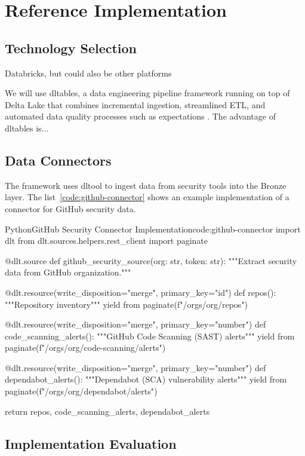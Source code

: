 \chapter{Reference Implementation}
\label{ch:implementation}

\section{Technology Selection}

Databricks, but could also be other platforms

We will use \gls{dltables}, a data engineering pipeline framework running on top of Delta Lake that combines incremental ingestion, streamlined ETL, and automated data quality processes such as expectations \cite{Lee2024}. The advantage of \gls{dltables} is...

\section{Data Connectors}

The framework uses \gls{dltool} to ingest data from security tools into the Bronze layer. The list~\ref{code:github-connector} shows an example implementation of a connector for GitHub security data.

\begin{code}{Python}{GitHub Security Connector Implementation}{code:github-connector}
import dlt
from dlt.sources.helpers.rest_client import paginate

@dlt.source
def github_security_source(org: str, token: str):
    """Extract security data from GitHub organization."""

    @dlt.resource(write_disposition="merge", primary_key="id")
    def repos():
        """Repository inventory"""
        yield from paginate(f"/orgs/{org}/repos")

    @dlt.resource(write_disposition="merge", primary_key="number")
    def code_scanning_alerts():
        """GitHub Code Scanning (SAST) alerts"""
        yield from paginate(f"/orgs/{org}/code-scanning/alerts")

    @dlt.resource(write_disposition="merge", primary_key="number")
    def dependabot_alerts():
        """Dependabot (SCA) vulnerability alerts"""
        yield from paginate(f"/orgs/{org}/dependabot/alerts")

    return repos, code_scanning_alerts, dependabot_alerts
\end{code}

\section{Implementation Evaluation}

